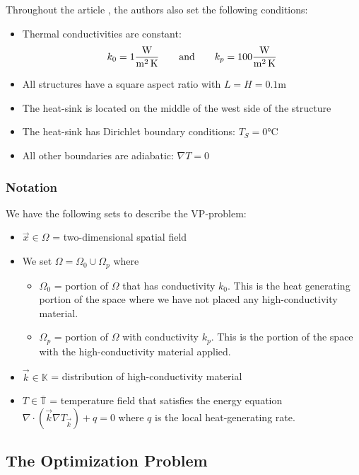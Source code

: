 Throughout the article \cite[]{Marck2012}, the authors also set the following conditions:
\begin{itemize}
	\item Thermal conductivities are constant:
	$$k_0=1 \si[per-mode=fraction]{\watt\per\square\meter\per\kelvin}\qquad\text{and}\qquad k_p=100 \si[per-mode=fraction]{\watt\per\square\meter\per\kelvin}$$
	\item All structures have a square aspect ratio with $L=H=0.1\si{\meter}$
	\item The heat-sink is located on the middle of the west side of the structure
	\item The heat-sink has Dirichlet boundary conditions: $T_S=0\si{\celsius}$
	\item All other boundaries are adiabatic: $\nabla T=0$
\end{itemize}

\subsubsection*{Notation}

We have the following sets to describe the VP-problem:
\begin{itemize}
	\item $\vec{x}\in\Omega$ = two-dimensional spatial field
	\item[] We set $\Omega = \Omega_0\cup\Omega_p$ where
	\begin{itemize}
		\item $\Omega_0$ = portion of $\Omega$ that has conductivity $k_0$. This is the heat generating portion of the space where we have not placed any high-conductivity material.
		\item $\Omega_p$ = portion of $\Omega$ with conductivity $k_p$. This is the portion of the space with the high-conductivity material applied.
	\end{itemize}
	\item $\vec{k}\in\mathbb{K}$ = distribution of high-conductivity material
	\item $T\in\overline{\mathbb{T}}$ = temperature field that satisfies the energy equation {\color{baystate}$\nabla\cdot\left(\vec{k}\nabla T_{\vec{k}}\right)+q=0$} where $q$ is the local heat-generating rate.
\end{itemize}

\subsection{The Optimization Problem}


